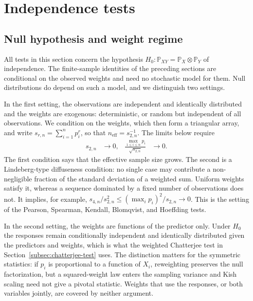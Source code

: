 \section{Independence tests}
\label{sec:independence-tests}

\subsection{Null hypothesis and weight regime}
\label{subsec:test-framework}

All tests in this section concern the hypothesis
$H_0\colon \mathbb{P}_{XY}=\mathbb{P}_X\otimes\mathbb{P}_Y$ of independence.
The finite-sample identities of the preceding sections are conditional on the
observed weights and need no stochastic model for them. Null distributions do
depend on such a model, and we distinguish two settings.

In the first setting, the observations are independent and identically
distributed and the weights are exogenous: deterministic, or random but
independent of all observations. We condition on the weights, which then form
a triangular array, and write $s_{r,n} = \sum_{i=1}^n p_i^r$, so that
$n_{\mathrm{eff}} = s_{2,n}^{-1}$. The limits below require
\begin{align}
    s_{2,n}
    &\longrightarrow0,
    &
    \frac{\max_{1\leq i\leq n} p_i}{\sqrt{s_{2,n}}}
    &\longrightarrow0.
    \label{eq:weight-diffuseness}
\end{align}
The first condition says that the effective sample size grows. The second is a
Lindeberg-type diffuseness condition: no single case may contribute a
non-negligible fraction of the standard deviation of a weighted sum. Uniform
weights satisfy it, whereas a sequence dominated by a fixed number of
observations does not. It implies, for example,
$s_{4,n}/s_{2,n}^2\leq(\max_ip_i)^2/s_{2,n}\to0$. This is the setting of the
Pearson, Spearman, Kendall, Blomqvist, and Hoeffding tests.

In the second setting, the weights are functions of the predictor only. Under
$H_0$ the responses remain conditionally independent and identically
distributed given the predictors and weights, which is what the weighted
Chatterjee test in Section~\ref{subsec:chatterjee-test} uses. The distinction
matters for the symmetric statistics: if $p_i$ is proportional to a function
of $X_i$, reweighting preserves the null factorization, but a squared-weight
law enters the sampling variance and Kish scaling need not give a pivotal
statistic. Weights that use the responses, or both variables jointly, are
covered by neither argument.

